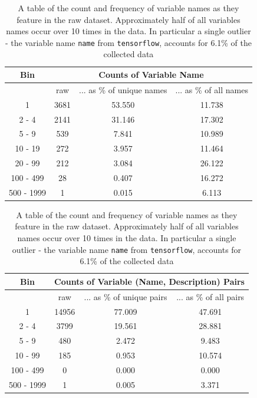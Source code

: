\begin{table}[p]
    \begin{center}
    \begin{tabular}{c | c | c | c  }       
     Bin   & \multicolumn{3}{c}{Counts of Variable Name}   \\
    \hline
     &     raw &... as \% of unique names & ... as \% of all names   \\  
    \hline     
     1     &      3681 &   53.550 &   11.738  \\          
     2 - 4 &      2141 &   31.146 &   17.302  \\          
     5 - 9 &       539 &    7.841 &   10.989  \\          
     10 - 19 &     272 &    3.957 &   11.464  \\          
     20 - 99 &     212 &    3.084 &   26.122  \\          
     100 - 499 &    28 &    0.407 &   16.272  \\          
     500 - 1999 &    1 &    0.015 &    6.113  \\                

    \end{tabular}
        \caption { A table of the count and frequency of variable names as they feature in the raw dataset. Approximately half of all variables names occur over 10 times in the data. In particular a single outlier - the variable name \texttt{name} from \texttt{tensorflow}, accounts for 6.1\% of the collected data}
    \label{table:variable_histogram}

    \begin{tabular}{c | c | c | c  }       

     Bin   & \multicolumn{3}{c}{Counts of Variable (Name, Description) Pairs}  \\
    \hline
     &     raw &... as \% of unique pairs & ... as \% of all pairs  \\  
    \hline     
    1 &     14956 &   77.009 &   47.691  \\
    2 - 4 &      3799 &   19.561 &   28.881 \\
    5 - 9 &       480 &    2.472 &    9.483 \\
    10 - 99 &     185 &    0.953 &   10.574 \\
    100 - 499 &     0 &    0.000 &    0.000 \\
    500 - 1999 &    1 &    0.005 &    3.371 \\           


\end{tabular}
\end{center}
\end{table}
